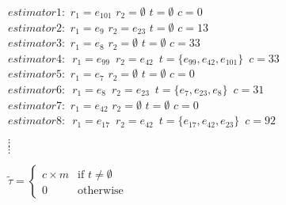 \documentclass[11pt]{beamer}
\begin{document}
\begin{frame}
\begin{minipage}[t]{0.48\linewidth}
\end{minipage}\hfill
\begin{minipage}[t]{0.48\linewidth}
\tiny$estimator1:$ $r_1=e_{101}$ $r_2=\emptyset$ $t=\emptyset$ $c=0$\\
$estimator2:$ $r_1=e_{9}$ $r_2=e_{23}$ $t=\emptyset$ $c=13$\\
$estimator3:$ $r_1=e_{8}$ $r_2=\emptyset$ $t=\emptyset$ $c=33$\\
\mbox{$estimator4:$ $r_1=e_{99}$ $r_2=e_{42}$ $t=\{e_{99},e_{42},e_{101}\}$ $c=33$}\\
$estimator5:$ $r_1=e_{7}$ $r_2=\emptyset$ $t=\emptyset$ $c=0$\\
\mbox{$estimator6:$ $r_1=e_{8}$ $r_2=e_{23}$ $t=\{e_7,e_{23},e_8\}$ $c=31$}\\
$estimator7:$ $r_1=e_{42}$ $r_2=\emptyset$ $t=\emptyset$ $c=0$\\
\mbox{$estimator8:$ $r_1=e_{17}$ $r_2=e_{42}$ $t=\{e_{17},e_{42},e_{23}\}$ $c=92$}\\
\begin{center}
$\vdots$\\
$\vdots$
\end{center}
\small
\vspace{1cm}
\end{minipage}
\begin{center}

$\tilde{\tau}=\begin{cases}c\times m & \text{if }t\neq \emptyset\\0 & \text{otherwise}\end{cases}$\\

\end{center}
\end{frame}
\end{document}
